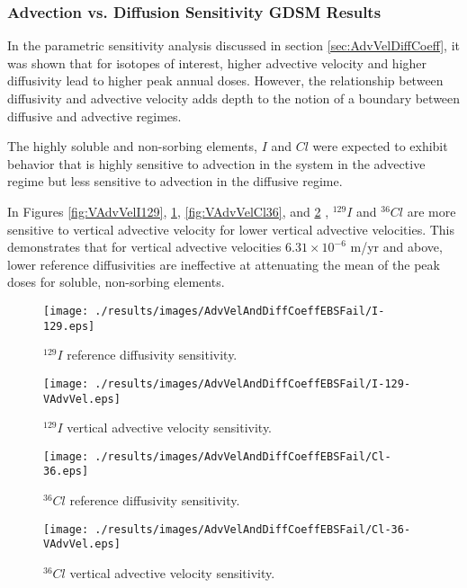 
\subsubsection{Advection vs. Diffusion Sensitivity GDSM Results}

In the parametric sensitivity analysis discussed in section
\ref{sec:AdvVelDiffCoeff}, it was shown that for isotopes of interest, higher
advective velocity and higher diffusivity lead to higher peak annual doses.
However, the relationship between diffusivity and advective
velocity adds depth to the notion of a boundary between diffusive and advective
regimes.

The highly soluble and non-sorbing elements, $I$ and $Cl$
were expected to exhibit behavior that is highly sensitive
to advection in the system in the advective regime but less sensitive to
advection in the diffusive regime.

In Figures \ref{fig:VAdvVelI129}, \ref{fig:VAdvVelI129VAdvVel},
\ref{fig:VAdvVelCl36}, and \ref{fig:VAdvVelCl36VAdvVel} , $^{129}I$ and
$^{36}Cl$ are more sensitive to vertical advective velocity for lower vertical
advective velocities. This demonstrates that for vertical advective velocities
$6.31\times10^{-6}$ m/yr and above, lower reference diffusivities are
ineffective at attenuating the mean of the peak doses for soluble, non-sorbing
elements.

\begin{figure}[htp!]
\begin{minipage}[b]{0.45\linewidth}
\centering
\texttt{[image: ./results/images/AdvVelAndDiffCoeffEBSFail/I-129.eps]}
\caption{$^{129}I$ reference diffusivity sensitivity.}
\label{fig:VAdvVelI129}

\end{minipage}
\hspace{0.05\linewidth}
\begin{minipage}[b]{0.45\linewidth}

\texttt{[image: ./results/images/AdvVelAndDiffCoeffEBSFail/I-129-VAdvVel.eps]}
\caption{$^{129}I$ vertical advective velocity sensitivity.}
\label{fig:VAdvVelI129VAdvVel}

\end{minipage}
\end{figure}

\begin{figure}[htp!]
\begin{minipage}[b]{0.45\linewidth}

\texttt{[image: ./results/images/AdvVelAndDiffCoeffEBSFail/Cl-36.eps]}
\caption{$^{36}Cl$ reference diffusivity sensitivity.}
\label{fig:VAdvVelCl36}

\end{minipage}
\hspace{0.05\linewidth}
\begin{minipage}[b]{0.45\linewidth}

\texttt{[image: ./results/images/AdvVelAndDiffCoeffEBSFail/Cl-36-VAdvVel.eps]}
\caption{$^{36}Cl$ vertical advective velocity sensitivity.}
\label{fig:VAdvVelCl36VAdvVel}
\end{minipage}
\end{figure}

